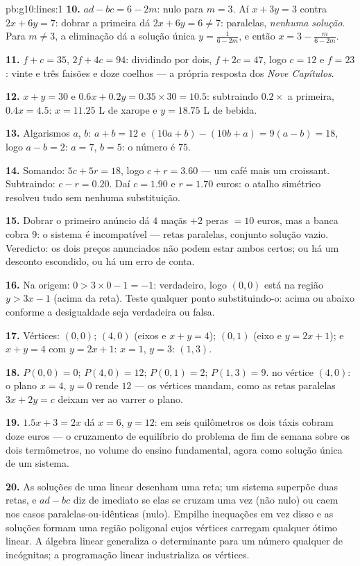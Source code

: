 \begin{solution}{pb:g10:lines:1}
\textbf{10.} $ad - bc = 6 - 2m$: nulo para $m = 3$. Aí
$x + 3y = 3$ contra $2x + 6y = 7$: dobrar a primeira dá
$2x + 6y = 6 \neq 7$: paralelas, \emph{nenhuma solução}. Para
$m \neq 3$, a eliminação dá a solução única
$y = \frac{1}{6 - 2m}$, e então $x = 3 - \frac{m}{6 - 2m}$.

\textbf{11.} $f + c = 35$, $2f + 4c = 94$: dividindo por dois,
$f + 2c = 47$, logo $c = 12$ e $f = 23$: vinte e três faisões e
doze coelhos --- a própria resposta dos \emph{Nove Capítulos}.

\textbf{12.} $x + y = 30$ e $0.6x + 0.2y = 0.35 \times 30 =
10.5$: subtraindo $0.2 \times$ a primeira, $0.4x = 4.5$:
$x = 11.25$ L de xarope e $y = 18.75$ L de bebida.

\textbf{13.} Algarismos $a$, $b$: $a + b = 12$ e
$(10a + b) - (10b + a) = 9(a - b) = 18$, logo $a - b = 2$:
$a = 7$, $b = 5$: o número é $75$.

\textbf{14.} Somando: $5c + 5r = 18$, logo $c + r = 3.60$ ---
um café mais um croissant. Subtraindo: $c - r = 0.20$. Daí
$c = 1.90$ e $r = 1.70$ euros: o atalho simétrico resolveu tudo
sem nenhuma substituição.

\textbf{15.} Dobrar o primeiro anúncio dá $4$ maçãs $+ 2$
peras $= 10$ euros, mas a banca cobra $9$: o sistema é
incompatível --- retas paralelas, conjunto solução vazio.
Veredicto: os dois preços anunciados não podem estar ambos
certos; ou há um desconto escondido, ou há um erro de conta.

\textbf{16.} Na origem: $0 > 3 \times 0 - 1 = -1$: verdadeiro,
logo $(0,0)$ está na região $y > 3x - 1$ (acima da reta). Teste
qualquer ponto substituindo-o: acima ou abaixo conforme a
desigualdade seja verdadeira ou falsa.

\textbf{17.} Vértices: $(0, 0)$; $(4, 0)$ (eixos e
$x + y = 4$); $(0, 1)$ (eixo e $y = 2x + 1$); e $x + y = 4$ com
$y = 2x + 1$: $x = 1$, $y = 3$: $(1, 3)$.

\textbf{18.} $P(0,0) = 0$; $P(4, 0) = 12$; $P(0, 1) = 2$;
$P(1, 3) = 9$.  no vértice $(4, 0)$: o plano $x = 4$,
$y = 0$ rende $12$ --- os vértices mandam, como as retas
paralelas $3x + 2y = c$ deixam ver ao varrer o plano.

\textbf{19.} $1.5x + 3 = 2x$ dá $x = 6$, $y = 12$: em seis
quilômetros os dois táxis cobram doze euros --- o cruzamento de
equilíbrio do problema de fim de semana sobre os dois
termômetros, no volume do ensino fundamental, agora como
solução única de um sistema.

\textbf{20.} As soluções de uma  linear desenham uma
reta; um sistema superpõe duas retas, e $ad - bc$ diz de
imediato se elas se cruzam uma vez (não nulo) ou caem nos casos
paralelas-ou-idênticas (nulo). Empilhe inequações em vez disso
e as soluções formam uma região poligonal cujos vértices
carregam qualquer ótimo linear. A álgebra linear generaliza o
determinante para um número qualquer de incógnitas; a
programação linear industrializa os vértices.
\end{solution}
